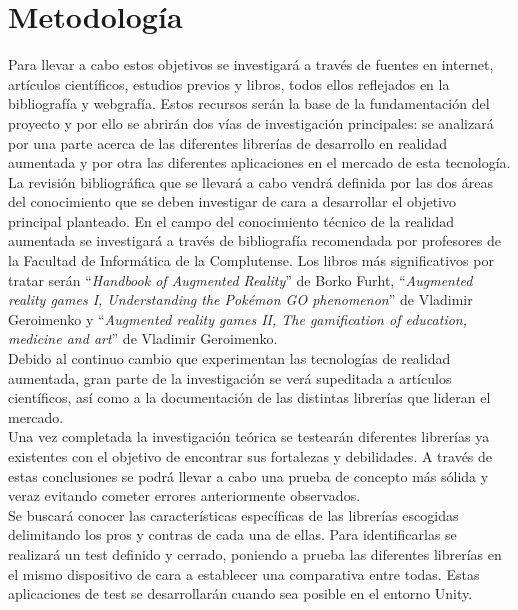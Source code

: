 \section{Metodología}
Para llevar a cabo estos objetivos se investigará a través de fuentes en internet, artículos científicos, estudios previos y libros, todos ellos reflejados en la bibliografía y webgrafía. Estos recursos serán la base de la fundamentación del proyecto y por ello se abrirán dos vías de investigación principales: se analizará por una parte acerca de las diferentes librerías de desarrollo en realidad aumentada y por otra las diferentes aplicaciones en el mercado de esta tecnología.\\

La revisión bibliográfica que se llevará a cabo vendrá definida por las dos áreas del conocimiento que se deben investigar de cara a desarrollar el objetivo principal planteado. En el campo del conocimiento técnico de la realidad aumentada se investigará a través de bibliografía recomendada por profesores de la Facultad de Informática de la Complutense. Los libros más significativos por tratar serán “\textit{Handbook of Augmented Reality}” de Borko Furht, “\textit{Augmented reality games I, Understanding the Pokémon GO phenomenon}” de Vladimir Geroimenko y “\textit{Augmented reality games II, The gamification of education, medicine and art}” de Vladimir Geroimenko.\\

Debido al continuo cambio que experimentan las tecnologías de realidad aumentada, gran parte de la investigación se verá supeditada a artículos científicos, así como a la documentación de las distintas librerías que lideran el mercado.\\

Una vez completada la investigación teórica se testearán diferentes librerías ya existentes con el objetivo de encontrar sus fortalezas y debilidades. A través de estas conclusiones se podrá llevar a cabo una prueba de concepto más sólida y veraz evitando cometer errores anteriormente observados.\\

Se buscará conocer las características específicas de las librerías escogidas delimitando los pros y contras de cada una de ellas. Para identificarlas se realizará un test definido y cerrado, poniendo a prueba las diferentes librerías en el mismo dispositivo de cara a establecer una comparativa entre todas. Estas aplicaciones de test se desarrollarán cuando sea posible en el entorno Unity.\\

